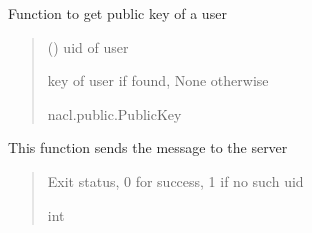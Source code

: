 \documentclass[letterpaper,10pt,english]{sphinxmanual}
\begin{document}
\begin{fulllineitems}
\begin{fulllineitems}
\begin{quote}
\begin{description}
\end{description}\end{quote}

\end{fulllineitems}


\begin{fulllineitems}
\label{\detokenize{Message:Message.Message._get_user_public_key}}
\pysigstartsignatures
{}
\pysigstopsignatures
\sphinxAtStartPar
Function to get public key of a user
\begin{quote}\begin{description}
\sphinxAtStartPar
{} () \textendash{} uid of user

\sphinxAtStartPar
key of user if found, None otherwise

\sphinxAtStartPar
nacl.public.PublicKey

\end{description}\end{quote}

\end{fulllineitems}


\begin{fulllineitems}
\label{\detokenize{Message:Message.Message._sendmsg}}
\pysigstartsignatures
{}
\pysigstopsignatures
\sphinxAtStartPar
This function sends the message to the server
\begin{quote}\begin{description}
\sphinxAtStartPar
Exit status, 0 for success, 1 if no such uid

\sphinxAtStartPar
int

\end{description}\end{quote}

\end{fulllineitems}


\end{fulllineitems}
\end{document}
